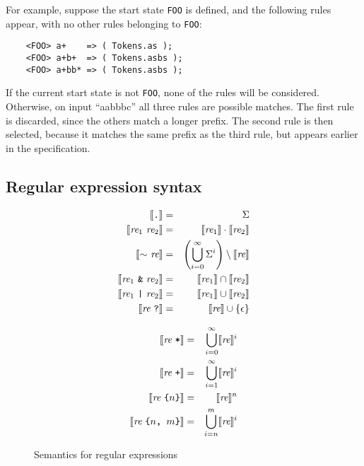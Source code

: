 For example, suppose the start state {\tt FOO} is defined, and the following rules appear, with no other rules belonging to {\tt FOO}:
\begin{verbatim}
    <FOO> a+    => ( Tokens.as );
    <FOO> a+b+  => ( Tokens.asbs );
    <FOO> a+bb* => ( Tokens.asbs );
\end{verbatim}
If the current start state is not {\tt FOO}, none of the rules will be considered.  Otherwise, on input ``aabbbc'' all three rules are possible matches.  The first rule is discarded, since the others match a longer prefix.  The second rule is then selected, because it matches the same prefix as the third rule, but appears earlier in the specification.

\subsection{Regular expression syntax}

\newcommand{\REX}{\textit{re}}
\begin{figure}
\begin{minipage}[t]{.5\textwidth}
\begin{eqnarray*}
  \sem{\T{.}} &=& \Sigma \\
  \sem{\REX_1 \ \REX_2} &=& \sem{\REX_1} \cdot \sem{\REX_2} \\
  \sem{\T{$\sim$} \ \REX} &=& \left(\bigcup_{i=0}^\infty \Sigma^i\right)\setminus \sem{\REX} \\
  \sem{\REX_1 \ \T{\&} \ \REX_2} &=& \sem{\REX_1} \cap \sem{\REX_2} \\
  \sem{\REX_1 \ \T{|} \ \REX_2} &=& \sem{\REX_1} \cup \sem{\REX_2} \\
  \sem{\REX \ \T{?}} &=& \sem{\REX} \cup \{ \epsilon \}
\end{eqnarray*}
\end{minipage}\begin{minipage}[t]{.5\textwidth}
\begin{eqnarray*}
  \sem{\REX \ \T{*}} &=& \bigcup_{i=0}^\infty \sem{\REX}^i \\
  \sem{\REX \ \T{+}} &=& \bigcup_{i=1}^\infty \sem{\REX}^i \\
  \sem{\REX \ \T{\{} n \T{\}}} &=& \sem{\REX}^n \\
  \sem{\REX \ \T{\{} n \T{, } m \T{\}}} &=& \bigcup_{i=n}^m \sem{\REX}^i
\end{eqnarray*}
\end{minipage}
\caption{Semantics for regular expressions}\label{ulex-re-semantics}
\end{figure}

